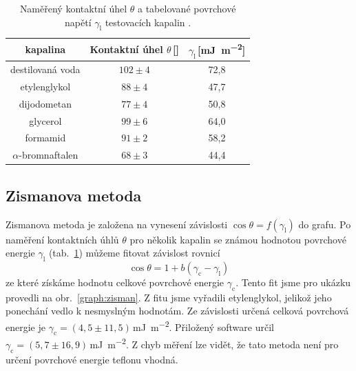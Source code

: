 \documentclass{protokol}
\begin{document}
\begin{table}[h]
	\caption{Naměřený kontaktní úhel $\theta$ a tabelované povrchové napětí 
	$\gamma_{\text{l}}$ testovacích kapalin \cite{napetiKapalin}.}
	\label{table:surfTensionLiquid}
	\begin{tabular}{|c|c|c|}\hline
		kapalina  & Kontaktní úhel $\theta$\,[\si{\deg}] &
		$\gamma_{\text{l}}$\,[\si{\milli\joule\per\meter\squared}]\\ \hline
		destilovaná voda & $102\pm4$ & 72,8                              \\
		etylenglykol     & $88\pm4$ & 47,7                              \\
		dijodometan      & $77\pm4$ & 50,8                              \\
		glycerol         & $99\pm6$ & 64,0                              \\
		formamid         & $91\pm2$ & 58,2                              \\
		$\alpha$-bromnaftalen &$68\pm3$ & 44,4  \\ \hline
	\end{tabular}
\end{table}





\subsection{Zismanova metoda}
\par Zismanova metoda je založena na vynesení závislosti $\cos\theta = 
f\left(\gamma_{\text{l}} \right)$ do grafu. Po naměření kontaktních úhlů 
$\theta$ pro několik kapalin se známou hodnotou povrchové energie 
$\gamma_{\text{l}}$ (tab.~\ref{table:surfTensionLiquid}) můžeme fitovat 
závislost rovnicí
\begin{equation}
	\cos\theta = 1 + 
	b \left( \gamma_{\text{c}} - \gamma_{\text{l}} \right)
\end{equation}
ze které získáme hodnotu celkové povrchové energie $\gamma_{\text{c}}$. Tento 
fit jsme pro ukázku provedli na obr.~\ref{graph:zisman}. Z fitu jsme vyřadili 
etylenglykol, jelikož jeho ponechání vedlo k nesmyslným hodnotám. Ze závislosti 
určená celková povrchová energie je $\gamma_{\text{c}} = 
(4,5\pm11,5)$\,\si{\milli\joule\per\meter\squared}. Přiložený software určil 
$\gamma_{\text{c}} = 
(5,7\pm16,9)$\,\si{\milli\joule\per\meter\squared}. Z chyb měření lze vidět, že 
tato 
metoda není pro určení povrchové energie teflonu vhodná.
\end{document}
